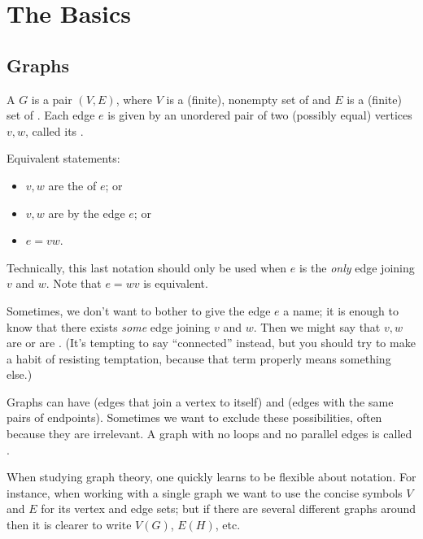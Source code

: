 


\section{The Basics}

\subsection{Graphs}

\begin{definition}
 A  $G$ is a pair $(V,E)$, where
$V$ is a (finite), nonempty set of 
and $E$ is a (finite) set of .
Each edge $e$ is given by an unordered pair of two (possibly equal) vertices
$v,w$, called its .
\end{definition}



Equivalent statements:
\begin{itemize}
\item $v,w$ are the  of $e$; or
\item $v,w$ are  by the edge $e$; or
\item $e=vw$.
\end{itemize}
Technically, this last notation should only be used when $e$ is the
\emph{only} edge joining  $v$ and $w$.  Note that $e=wv$ is equivalent.

Sometimes, we don't want to bother to give the edge $e$ a name; it is
enough to know that there exists \emph{some} edge joining $v$ and $w$.
Then we might say that $v,w$ are  or are .
(It's tempting to say ``connected'' instead, but you should try to make a habit
of resisting temptation, because that term properly means something else.)

Graphs can have  (edges that join a vertex to itself) and  (edges with the same pairs of endpoints).  Sometimes we want to exclude these possibilities, often because they are irrelevant.  A graph with no loops and no parallel edges is called .

  When studying graph theory, one quickly learns to be flexible
  about notation.  For instance, when working with a single graph we want
  to use the concise symbols $V$ and $E$ for its vertex and edge sets; but
  if there are several different graphs around then it is clearer to write
  $V(G)$, $E(H)$, etc.

